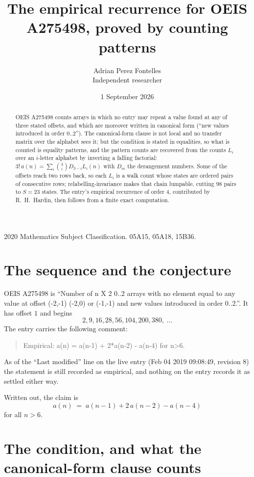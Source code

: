 \documentclass[11pt,a4paper]{article}
\title{The empirical recurrence for OEIS A275498, proved by counting patterns}
\author{Adrian Perez Fontelles\\ \small Independent researcher}
\date{1 September 2026}
\theoremstyle{plain}
\theoremstyle{definition}
\begin{document}
\maketitle

\begin{abstract}
OEIS A275498 counts arrays in which no entry may repeat a value found at any of three stated
offsets, and which are moreover written in canonical form (``new values introduced in order
$0..2$''). The canonical-form clause is not local and no transfer matrix over the
alphabet sees it; but the condition is stated in equalities, so what is counted is equality
patterns, and the pattern counts are recovered from the counts $L_i$ over an $i$-letter
alphabet by inverting a falling factorial:
$3!\,a(n)=\sum_i\binom{3}{i}D_{3-i}L_i(n)$ with $D_m$ the derangement numbers.
Some of the offsets reach two rows back, so each $L_i$ is a walk count whose states are
ordered pairs of consecutive rows; relabelling-invariance makes that chain lumpable,
cutting $98$ pairs to $S=23$ states. The entry's empirical recurrence of order $4$,
contributed by R.~H.~Hardin, then follows from a finite exact computation.
\end{abstract}

\noindent\small 2020 Mathematics Subject Classification. 05A15, 05A18, 15B36.\normalsize

\section{The sequence and the conjecture}

OEIS A275498 is ``Number of n X 2 0..2 arrays with no element equal to any value at offset (-2,-1) (-2,0) or (-1,-1) and new values introduced in order 0..2.''. It has offset $1$ and begins
\[
2, 9, 16, 28, 56, 104, 200, 380,\ \dots
\]
The entry carries the following comment:
\begin{quote}\small
Empirical: a(n) = a(n-1) + 2*a(n-2) - a(n-4) for n>6.
\end{quote}
As of the ``Last modified'' line on the live entry (Feb 04 2019 09:08:49, revision 8) the statement is
still recorded as empirical, and nothing on the entry records it as settled either way.

Written out, the claim is
\begin{equation}\label{eq:conj}
a(n)\;=\;a(n-1) + 2\,a(n-2) - a(n-4)
\end{equation}
for all $n>6$.

\section{The condition, and what the canonical-form clause counts}
\end{document}
